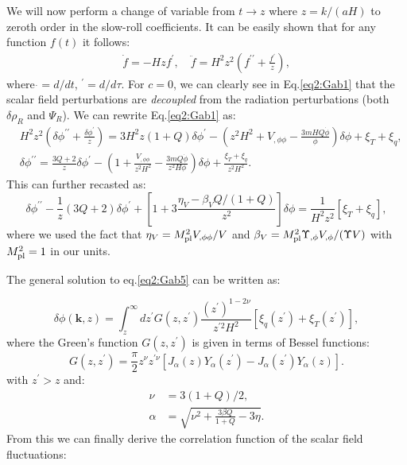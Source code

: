 We will now perform a change of variable from $t\rightarrow z$ where  $z=k/(aH)$ to zeroth order in the slow-roll coefficients. It can be easily shown that for any function $f(t)$ it follows:
\begin{align}
    \dot{f}=-Hzf^\prime, \quad \ddot{f}=H^2z^2\left(f^{\prime\prime}+\frac{f^\prime}{z}\right),
\end{align}
where $\dot{}=d/dt$, $^\prime=d/d\tau$. 
For $c=0$, we can clearly see in Eq.\ref{eq2:Gab1} that the scalar field perturbations are \textit{decoupled} from the radiation perturbations (both $\delta\rho_R$ and $\Psi_R$). We can rewrite Eq.\ref{eq2:Gab1} as:
\begin{align}
    &H^2z^2\left(\delta \phi^{\prime\prime}+\frac{\delta\phi^\prime}{z}\right)=3H^2z(1+Q)\delta \phi^\prime-\left(z^2H^2+V_{, \phi \phi}-\frac{3mHQ \dot{\phi}}{\phi}\right) \delta \phi +\xi_T+\xi_q, \nonumber \\
    &\delta \phi^{\prime\prime}=\frac{3Q+2}{z}\delta \phi^\prime-\left(1+\frac{V_{, \phi \phi}}{z^2H^2}-\frac{3mQ \dot{\phi}}{z^2 H\phi}\right) \delta \phi +\frac{\xi_T+\xi_q}{z^2H^2}.\label{eq2:Gab4}
\end{align}
This can further recasted as:
\begin{equation}
 \delta \phi^{\prime \prime}-\frac{1}{z}(3 Q+2) \delta \phi^{\prime}+\left[1+3 \frac{\eta_V-\beta_V Q /(1+Q)}{z^2}\right] \delta \phi =\frac{1}{H^2 z^2}\left[\xi_T+\xi_q\right], \label{eq2:Gab5}
\end{equation}
where we used the fact that $\eta_V=M_{\rm{pl}}^2V_{,\phi\phi}/V$ and $\beta_V=M_{\rm{pl}}^2\Upsilon_{,\phi}V_{,\phi}/(\Upsilon V)$ with $M_{\rm{pl}}^2=1$ in our units. 

The general solution to eq.\ref{eq2:Gab5} can be written as:

\begin{equation}
\delta \phi(\mathbf{k}, z)=\int_z^{\infty} d z^{\prime} G\left(z, z^{\prime}\right) \frac{\left(z^{\prime}\right)^{1-2 \nu}}{z^{\prime 2} H^2}\left[\xi_q\left(z^{\prime}\right)+\xi_T\left(z^{\prime}\right)\right],
\end{equation}
where the Green's function $G(z,z^\prime)$ is given in terms of Bessel functions:
\begin{equation}
    G\left(z, z^{\prime}\right)=\frac{\pi}{2} z^\nu z^{\prime \nu}\left[J_\alpha(z) Y_\alpha\left(z^{\prime}\right)-J_\alpha\left(z^{\prime}\right) Y_\alpha(z)\right].
\end{equation}
with $z^\prime>z$ and:
\begin{align}
\nu & =3(1+Q) / 2, \\
\alpha & =\sqrt{\nu^2+\frac{3 \beta
Q}{1+Q}-3 \eta}.
\end{align}
From this we can finally derive the correlation function of the scalar field fluctuations:

